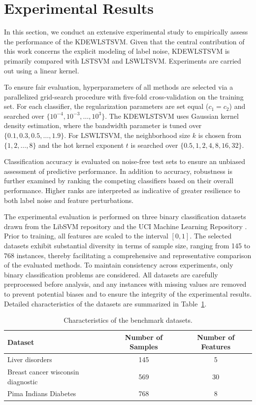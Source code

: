 \documentclass[twoside]{article}
\begin{document}
\section{Experimental Results}\label{sec:results}
In this section, we conduct an extensive experimental study to empirically assess the performance of the KDEWLSTSVM. Given that the central contribution of this work concerns the explicit modeling of label noise, KDEWLSTSVM is primarily compared with LSTSVM and LSWLTSVM. Experiments are carried out using a linear kernel.

To ensure fair evaluation, hyperparameters of all methods are selected via a parallelized grid-search procedure with five-fold cross-validation on the training set. For each classifier, the regularization parameters are set equal ($c_1 = c_2$) and searched over $\{10^{-4}, 10^{-3}, \ldots, 10^{3}\}$. The KDEWLSTSVM uses Gaussian kernel density estimation, where the bandwidth parameter is tuned over $\{0.1, 0.3, 0.5, \ldots, 1.9\}$. For LSWLTSVM, the neighborhood size $k$ is chosen from $\{1, 2, \ldots, 8\}$ and the hot kernel exponent $t$ is searched over $\{0.5, 1, 2, 4, 8, 16, 32\}$.

Classification accuracy is evaluated on noise-free test sets to ensure an unbiased assessment of predictive performance. In addition to accuracy, robustness is further examined by ranking the competing classifiers based on their overall performance. Higher ranks are interpreted as indicative of greater resilience to both label noise and feature perturbations.

The experimental evaluation is performed on three binary classification datasets drawn from the LibSVM repository \citep{Chang2001LIBSVM} and the UCI Machine Learning Repository \citep{Bache2013UCI}. Prior to training, all features are scaled to the interval \([0,1]\). The selected datasets exhibit substantial diversity in terms of sample size, ranging from 145 to 768 instances, thereby facilitating a comprehensive and representative comparison of the evaluated methods. To maintain consistency across experiments, only binary classification problems are considered. All datasets are carefully preprocessed before analysis, and any instances with missing values are removed to prevent potential biases and to ensure the integrity of the experimental results. Detailed characteristics of the datasets are summarized in Table~\ref{tab1}.

\begin{table}[h]
\footnotesize
    \centering
    \caption{Characteristics of the benchmark datasets.}
    \label{tab1}
    \begin{tabular}{lcc}
        \hline
        \textbf{Dataset} & \textbf{Number of Samples} & \textbf{Number of Features} \\
        \hline
        Liver disorders&145&5\\
        Breast cancer wisconsin diagnostic&569 &30 \\
        Pima Indians Diabetes & 768 & 8 \\
        \hline
    \end{tabular}
\end{table}
\end{document}
